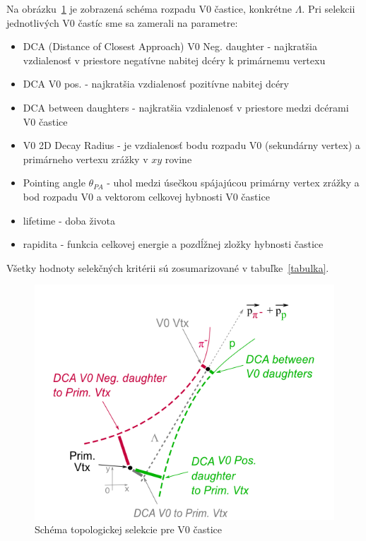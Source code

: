 \documentclass[thesismargins, thesislinespacing]{rnthesis}
\begin{document}
Na obrázku~\ref{schema} je zobrazená schéma rozpadu V0 častice, konkrétne $\Lambda$. Pri selekcii jednotlivých V0 častíc sme sa zamerali na parametre:
\begin{itemize}
	\item DCA (Distance of Closest Approach) V0 Neg. daughter - najkratšia vzdialenosť v priestore negatívne nabitej dcéry k primárnemu vertexu
	\item DCA V0 pos. - najkratšia vzdialenosť pozitívne nabitej dcéry
	\item DCA between daughters - najkratšia vzdialenosť v priestore medzi dcérami V0 častice
	\item V0 2D Decay Radius  - je vzdialenosť bodu rozpadu V0 (sekundárny vertex) a primárneho vertexu zrážky v $xy$ rovine
	\item Pointing angle $\theta_{PA}$ - uhol medzi úsečkou spájajúcou primárny vertex zrážky a bod rozpadu V0 a vektorom celkovej hybnosti V0 častice
	\item lifetime - doba života
	\item rapidita - funkcia celkovej energie a pozdĺžnej zložky hybnosti častice
\end{itemize} 
Všetky hodnoty selekčných kritérii sú zosumarizované v tabuľke~\ref{tabulka}.

\begin{figure}[hbtp!]
	\centering
	\includegraphics[scale=0.9]{./Obrazky_praca/SchemaV0.png}
	\caption{Schéma topologickej selekcie pre V0 častice~\cite{schema}}
	\label{schema} 
\end{figure}
\end{document}
